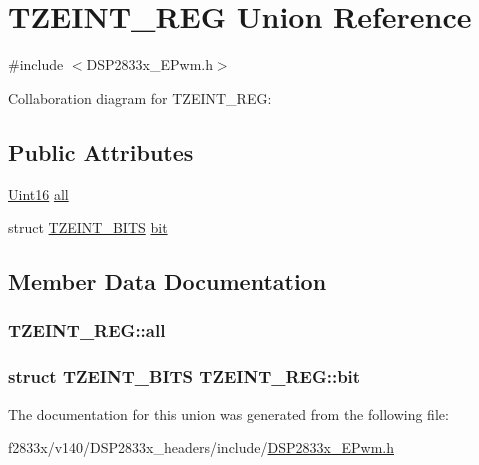 \hypertarget{union_t_z_e_i_n_t___r_e_g}{}\section{T\+Z\+E\+I\+N\+T\+\_\+\+R\+E\+G Union Reference}
\label{union_t_z_e_i_n_t___r_e_g}


{\ttfamily \#include $<$D\+S\+P2833x\+\_\+\+E\+Pwm.\+h$>$}



Collaboration diagram for T\+Z\+E\+I\+N\+T\+\_\+\+R\+E\+G\+:
\subsection*{Public Attributes}
\begin{DoxyCompactItemize}
\item 
\hyperlink{_d_s_p2833x___device_8h_a59a9f6be4562c327cbfb4f7e8e18f08b}{Uint16} \hyperlink{union_t_z_e_i_n_t___r_e_g_a7a312a5bc10a31c9f9e536bd32afd09c}{all}
\item 
struct \hyperlink{struct_t_z_e_i_n_t___b_i_t_s}{T\+Z\+E\+I\+N\+T\+\_\+\+B\+I\+T\+S} \hyperlink{union_t_z_e_i_n_t___r_e_g_a012d55fc7f01f604d38099c5f40ffd9d}{bit}
\end{DoxyCompactItemize}


\subsection{Member Data Documentation}
\hypertarget{union_t_z_e_i_n_t___r_e_g_a7a312a5bc10a31c9f9e536bd32afd09c}{}
\subsubsection[{all}]{ T\+Z\+E\+I\+N\+T\+\_\+\+R\+E\+G\+::all}\label{union_t_z_e_i_n_t___r_e_g_a7a312a5bc10a31c9f9e536bd32afd09c}
\hypertarget{union_t_z_e_i_n_t___r_e_g_a012d55fc7f01f604d38099c5f40ffd9d}{}
\subsubsection[{bit}]{\setlength{\rightskip}{0pt plus 5cm}struct {\bf T\+Z\+E\+I\+N\+T\+\_\+\+B\+I\+T\+S} T\+Z\+E\+I\+N\+T\+\_\+\+R\+E\+G\+::bit}\label{union_t_z_e_i_n_t___r_e_g_a012d55fc7f01f604d38099c5f40ffd9d}


The documentation for this union was generated from the following file\+:\begin{DoxyCompactItemize}
\item 
f2833x/v140/\+D\+S\+P2833x\+\_\+headers/include/\hyperlink{_d_s_p2833x___e_pwm_8h}{D\+S\+P2833x\+\_\+\+E\+Pwm.\+h}\end{DoxyCompactItemize}
